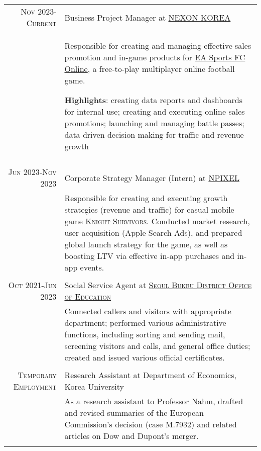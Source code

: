 \documentclass[a4paper,10pt]{article} %
\begin{document}
\begin{tabular}{r|p{11cm}}
    
    \textsc{Nov 2023-Current} & Business Project Manager at
    \href{https://www.nexon.com}{\textsc{NEXON KOREA}} \emph{}\\
& \footnotesize{Responsible for creating and managing effective sales promotion and in-game
    products for
    \href{https://fconline.nexon.com}{EA Sports FC Online}, a free-to-play
    multiplayer online football game.
    
    \textbf{Highlights}: creating data reports and dashboards for internal use;
    creating and executing online sales promotions;
    launching and managing battle passes; data-driven decision making for
traffic and revenue growth}\\
\multicolumn{2}{c}{} \\

    \textsc{Jun 2023-Nov 2023} & Corporate Strategy Manager (Intern) at
    \href{https://www.npixel.co.kr}{\textsc{NPIXEL}} \emph{}\\
& \footnotesize{Responsible for creating and executing 
    growth strategies (revenue and traffic) for casual mobile game \href{https://play.google.com/store/apps/details?id=com.npixel.knightsurvivors}{\textsc{Knight Survivors}}.
Conducted market research, user acquisition (Apple Search Ads), and prepared
global launch strategy for the game, as well as boosting LTV via effective in-app
purchases and in-app events.}\\
\multicolumn{2}{c}{} \\

\textsc{Oct 2021-Jun 2023} & Social Service Agent at \href{http://bbedu.sen.go.kr}{\textsc{Seoul Bukbu
District Office of Education}} \emph{}\\
& \footnotesize{Connected callers and visitors with appropriate department;
performed various administrative functions, including sorting and sending
mail, screening visitors and calls, and general office duties; created and
issued various official certificates.}\\
\multicolumn{2}{c}{} \\

\textsc{Temporary Employment} & Research Assistant at Department of Economics, Korea University\\ 
& \footnotesize{As a research assistant to
    \href{http://econ.korea.ac.kr/econ/?dt_team=%EB%82%A8%EC%9E%AC%ED%98%84-jae-nahm}{Professor
    Nahm}, drafted and revised summaries of the European Commission's decision (case M.7932) and related
articles on Dow and Dupont's merger.}\\
\multicolumn{2}{c}{} \\


\end{tabular}
\end{document}
